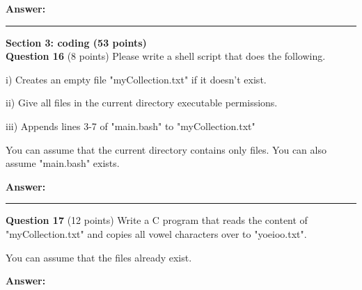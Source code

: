 \documentclass{exam}
\begin{document}
\textbf{Answer:}

\newpage




\begin{center}\noindent\rule{6in}{0.4pt}\end{center}

{\Large\textbf{Section 3: coding (53 points)}}
\\

\textbf{Question 16} (8 points) Please write a shell script that does the following.

i) Creates an empty file "myCollection.txt" if it doesn't exist.

ii) Give all files in the current directory executable permissions.

iii) Appends lines 3-7 of "main.bash" to "myCollection.txt"

You can assume that the current directory contains only files. You can also assume "main.bash" exists.

\textbf{Answer:}

\newpage




\begin{center}\noindent\rule{6in}{0.4pt}\end{center}

\textbf{Question 17} (12 points) Write a C program that reads the content of "myCollection.txt" and copies all vowel characters over to "yoeioo.txt".

You can assume that the files already exist.

\textbf{Answer:}

\newpage



\end{document}
